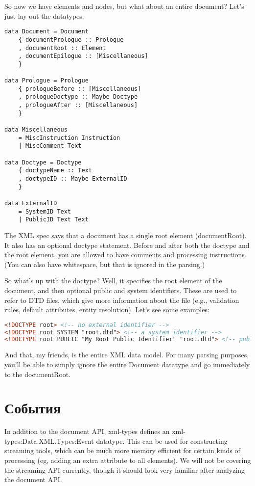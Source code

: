 So now we have elements and nodes, but what about an entire document? Let's just lay out the datatypes:

\begin{lstlisting}
data Document = Document
    { documentPrologue :: Prologue
    , documentRoot :: Element
    , documentEpilogue :: [Miscellaneous]
    }

data Prologue = Prologue
    { prologueBefore :: [Miscellaneous]
    , prologueDoctype :: Maybe Doctype
    , prologueAfter :: [Miscellaneous]
    }

data Miscellaneous
    = MiscInstruction Instruction
    | MiscComment Text

data Doctype = Doctype
    { doctypeName :: Text
    , doctypeID :: Maybe ExternalID
    }

data ExternalID
    = SystemID Text
    | PublicID Text Text
\end{lstlisting}

The XML spec says that a document has a single root element (documentRoot). It also has an optional doctype statement. Before and after both the doctype and the root element, you are allowed to have comments and processing instructions. (You can also have whitespace, but that is ignored in the parsing.)

So what's up with the doctype? Well, it specifies the root element of the document, and then optional public and system identifiers. These are used to refer to DTD files, which give more information about the file (e.g., validation rules, default attributes, entity resolution). Let's see some examples:

\begin{lstlisting}[language=HTML]
<!DOCTYPE root> <!-- no external identifier -->
<!DOCTYPE root SYSTEM "root.dtd"> <!-- a system identifier -->
<!DOCTYPE root PUBLIC "My Root Public Identifier" "root.dtd"> <!-- public identifiers have a system ID as well -->
\end{lstlisting}

And that, my friends, is the entire XML data model. For many parsing purposes, you'll be able to simply ignore the entire Document datatype and go immediately to the documentRoot.

\section{События} %

In addition to the document API, xml-types defines an xml-types:Data.XML.Types:Event datatype. This can be used for constructing streaming tools, which can be much more memory efficient for certain kinds of processing (eg, adding an extra attribute to all elements). We will not be covering the streaming API currently, though it should look very familiar after analyzing the document API.

